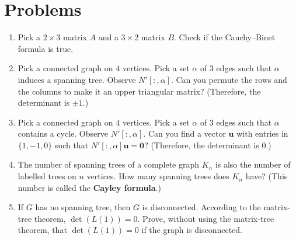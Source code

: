 \documentclass{article}
\newcommand{\bzero}{\mathbf{0}}
\newcommand{\bu}{\mathbf{u}}
\theoremstyle{definition}
\begin{document}
\section*{Problems}
\begin{enumerate}
\setlength\itemsep{2em}
\item Pick a $2\times 3$ matrix $A$ and a $3\times 2$ matrix $B$.  Check if the Cauchy--Binet formula is true.
\item Pick a connected graph on $4$ vertices.  Pick a set $\alpha$ of $3$ edges such that $\alpha$ induces a spanning tree.  Observe $N'[:,\alpha]$.  Can you permute the rows and the columns to make it an upper triangular matrix?  (Therefore, the determinant is $\pm 1$.)
\item Pick a connected graph on $4$ vertices.  Pick a set $\alpha$ of $3$ edges such that $\alpha$ contains a cycle.  Observe $N'[:,\alpha]$.  Can you find a vector $\bu$ with entries in $\{1,-1,0\}$ such that $N'[:,\alpha]\bu = \bzero$?  (Therefore, the determinant is $0$.)
\item The number of spanning trees of a complete graph $K_n$ is also the number of labelled trees on $n$ vertices.  How many spanning trees does $K_n$ have?  (This number is called the \textbf{Cayley formula}.)
\item If $G$ has no spanning tree, then $G$ is disconnected.  According to the matrix-tree theorem, $\det(L(1)) = 0$.  Prove, without using the matrix-tree theorem, that $\det(L(1)) = 0$ if the graph is disconnected.
\end{enumerate}

\end{document}
